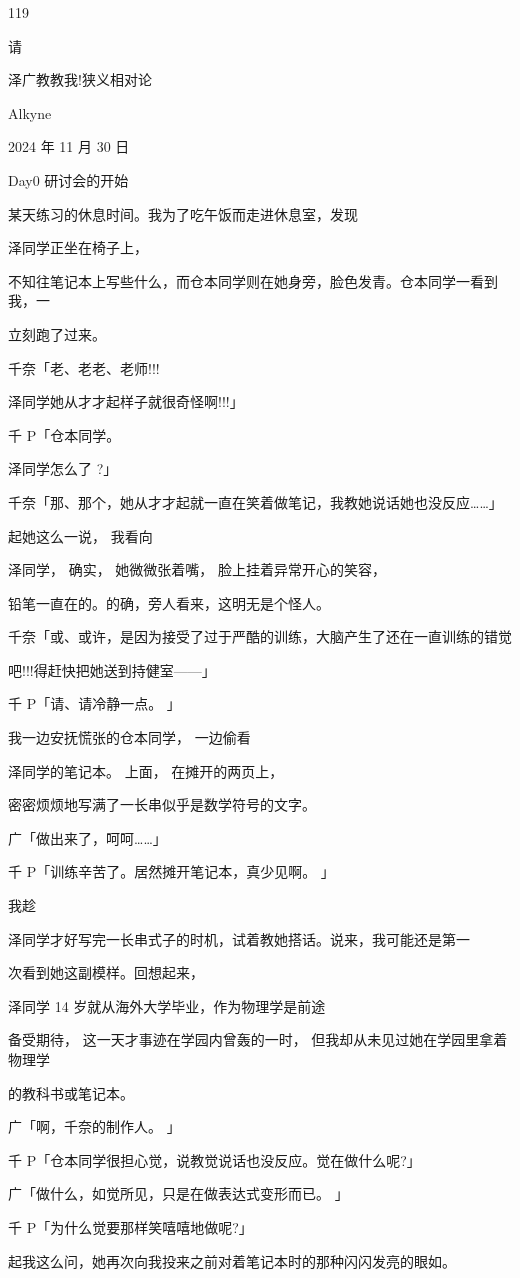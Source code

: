 119\par
请\par
泽广教教我!狭义相对论\par
Alkyne\par
2024 年 11 月 30 日\par
Day0 研讨会的开始\par
某天练习的休息时间。我为了吃午饭而走进休息室，发现\par
泽同学正坐在椅子上，\par
不知往笔记本上写些什么，而仓本同学则在她身旁，脸色发青。仓本同学一看到我，一\par
立刻跑了过来。\par
千奈「老、老老、老师!!!\par
泽同学她从才才起样子就很奇怪啊!!!」\par
千 P「仓本同学。\par
泽同学怎么了 ?」\par
千奈「那、那个，她从才才起就一直在笑着做笔记，我教她说话她也没反应……」\par
起她这么一说， 我看向\par
泽同学， 确实， 她微微张着嘴， 脸上挂着异常开心的笑容，\par
铅笔一直在的。的确，旁人看来，这明无是个怪人。\par
千奈「或、或许，是因为接受了过于严酷的训练，大脑产生了还在一直训练的错觉\par
吧!!!得赶快把她送到持健室——」\par
千 P「请、请冷静一点。 」\par
我一边安抚慌张的仓本同学， 一边偷看\par
泽同学的笔记本。 上面， 在摊开的两页上，\par
密密烦烦地写满了一长串似乎是数学符号的文字。\par
广「做出来了，呵呵……」\par
千 P「训练辛苦了。居然摊开笔记本，真少见啊。 」\par
我趁\par
泽同学才好写完一长串式子的时机，试着教她搭话。说来，我可能还是第一\par
次看到她这副模样。回想起来，\par
泽同学 14 岁就从海外大学毕业，作为物理学是前途\par
备受期待， 这一天才事迹在学园内曾轰的一时， 但我却从未见过她在学园里拿着物理学\par
的教科书或笔记本。\par
广「啊，千奈的制作人。 」\par
千 P「仓本同学很担心觉，说教觉说话也没反应。觉在做什么呢?」\par
广「做什么，如觉所见，只是在做表达式变形而已。 」\par
千 P「为什么觉要那样笑嘻嘻地做呢?」\par
起我这么问，她再次向我投来之前对着笔记本时的那种闪闪发亮的眼如。\par

